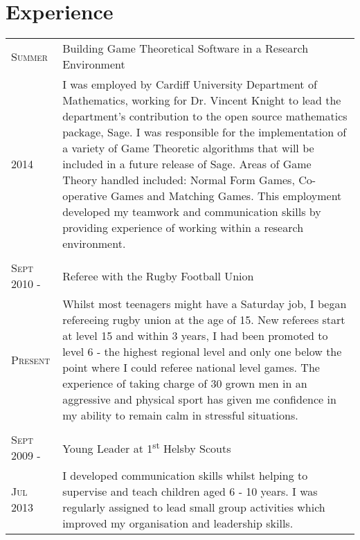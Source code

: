 \documentclass[a4paper]{article}
\begin{document}
\section{Experience}
\begin{tabularx}{\textwidth}{lX}

\textsc{Summer} & Building Game Theoretical Software in a Research Environment \\
\textsc{2014}& \footnotesize{I was employed by Cardiff University Department of Mathematics, working for Dr. Vincent Knight to lead the department's contribution to the open source mathematics package, Sage. I was responsible for the implementation of a variety of Game Theoretic algorithms that will be included in a future release of Sage. Areas of Game Theory handled included: Normal Form Games, Co-operative Games and Matching Games. This employment developed my teamwork and communication skills by providing experience of working within a research environment.}\\
\\
\textsc{Sept 2010 -} & Referee with the Rugby Football Union \\
\textsc{Present} & \footnotesize{Whilst most teenagers might have a Saturday job, I began refereeing rugby union at the age of 15. New referees start at level 15 and within 3 years, I had been promoted to level 6 - the highest regional level and only one below the point where I could referee national level games. The experience of taking charge of 30 grown men in an aggressive and physical sport has given me confidence in my ability to remain calm in stressful situations.}\\
\\
\textsc{Sept 2009 -} & Young Leader at 1\textsuperscript{st} Helsby Scouts\\
\textsc{Jul 2013}& \footnotesize{I developed communication skills whilst helping to supervise and teach children aged 6 - 10 years. I was regularly assigned to lead small group activities which improved my organisation and leadership skills.}\\

\end{tabularx}
\end{document}
